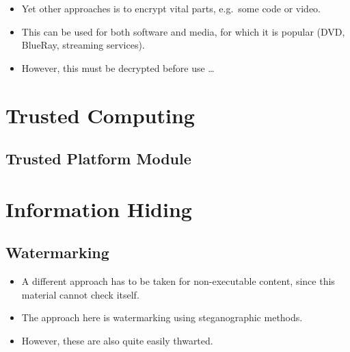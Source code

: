 \documentclass{beamer}
\begin{document}
\begin{frame}
  \begin{itemize}
    \item Yet other approaches is to encrypt vital parts, e.g.\ some code or 
      video.

    \item This can be used for both software and media, for which it is popular 
      (DVD, BlueRay, streaming services).

    \item However, this must be decrypted before use \dots
  \end{itemize}
\end{frame}


\section{Trusted Computing}

\subsection{Trusted Platform Module}

\begin{frame}
\end{frame}


\section{Information Hiding}

\subsection{Watermarking}

\begin{frame}
  \begin{itemize}
    \item A different approach has to be taken for non-executable content, 
      since this material cannot check itself.

    \item The approach here is watermarking using steganographic methods.

    \item However, these are also quite easily thwarted.
  \end{itemize}
\end{frame}




\begin{frame}
  \small
  \printbibliography{}
\end{frame}
\end{document}
